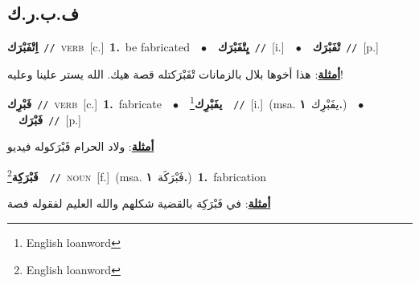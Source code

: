 \documentclass[10pt,a4paper,twoside]{article} %
\begin{document}
\begin{multicols}{2}
{\vspace{-3mm}
\subsection*{\color{blue}\foreignlanguage{arabic}{ف.ب.ر.ك}\color{blue}{ (ntws)}} 

{\setlength\topsep{0pt}\textbf{\foreignlanguage{arabic}{اِتْفَبْرَك}}\ {\color{gray}\texttt{//}\color{black}}\ \textsc{verb}\ [c.]\ \textbf{1.}~be fabricated\ \ $\bullet$\ \ \setlength\topsep{0pt}\textbf{\foreignlanguage{arabic}{يِتْفَبْرَك}}\ {\color{gray}\texttt{//}\color{black}}\ [i.]\ \ $\bullet$\ \ \setlength\topsep{0pt}\textbf{\foreignlanguage{arabic}{تْفَبْرَك}}\ {\color{gray}\texttt{//}\color{black}}\ [p.]\  \begin{flushright}\color{gray}\foreignlanguage{arabic}{\textbf{\underline{\foreignlanguage{arabic}{أمثلة}}}: هذا أخوها بلال بالزمانات تْفَبْرَكتله قصة هيك. الله يستر علينا وعليه!}\end{flushright}\color{black}} \vspace{2mm}

{\setlength\topsep{0pt}\textbf{\foreignlanguage{arabic}{فَبْرِك}}\ {\color{gray}\texttt{//}\color{black}}\ \textsc{verb}\ [c.]\ \textbf{1.}~fabricate\ \ $\bullet$\ \ \setlength\topsep{0pt}\textbf{\foreignlanguage{arabic}{يفَبْرِك}}\footnote{English loanword}\ \ {\color{gray}\texttt{//}\color{black}}\ [i.]\ \color{gray}(msa. \foreignlanguage{arabic}{يفَبْرِك}~\foreignlanguage{arabic}{\textbf{١.}})\color{black}\ \ $\bullet$\ \ \setlength\topsep{0pt}\textbf{\foreignlanguage{arabic}{فَبْرَك}}\ {\color{gray}\texttt{//}\color{black}}\ [p.]\  \begin{flushright}\color{gray}\foreignlanguage{arabic}{\textbf{\underline{\foreignlanguage{arabic}{أمثلة}}}: ولاد الحرام فَبْرَكوله فيديو}\end{flushright}\color{black}} \vspace{2mm}

{\setlength\topsep{0pt}\textbf{\foreignlanguage{arabic}{فَبْرَكِة}}\footnote{English loanword}\ \ {\color{gray}\texttt{//}\color{black}}\ \textsc{noun}\ [f.]\ \color{gray}(msa. \foreignlanguage{arabic}{فَبْرَكَة}~\foreignlanguage{arabic}{\textbf{١.}})\color{black}\ \textbf{1.}~fabrication\  \begin{flushright}\color{gray}\foreignlanguage{arabic}{\textbf{\underline{\foreignlanguage{arabic}{أمثلة}}}: في فَبْرَكِة بالقضية شكلهم والله العليم لفقوله فصة}\end{flushright}\color{black}} \vspace{2mm}

}
\end{multicols}
\end{document}

